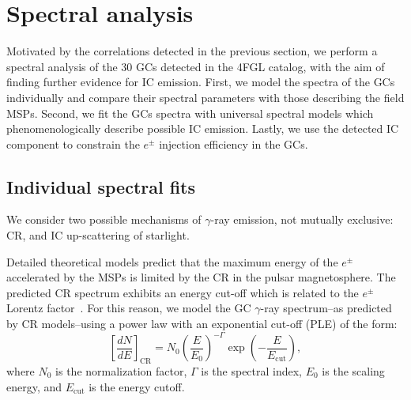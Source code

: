 \documentclass[doublespace,nopageskip]{VTthesis} %
\begin{document}
\section{Spectral analysis}\label{sec:spectra}

Motivated by the correlations detected in the previous section, we perform a spectral analysis of the 30 GCs detected in the 4FGL catalog, with the aim of finding further evidence for IC emission. First, we model the spectra of the GCs individually and compare their spectral parameters with those describing the field MSPs. Second, we fit the GCs spectra with universal spectral models which phenomenologically describe possible IC emission. Lastly, we use the detected IC component to constrain the $e^\pm$ injection efficiency in the GCs.

\subsection{Individual spectral fits}\label{sec:spectra_individual}

We consider two possible mechanisms of $\gamma$-ray emission, not mutually exclusive: CR, and IC up-scattering of starlight.

Detailed theoretical models predict that the maximum energy of the $e^\pm$ accelerated by the MSPs is limited by the CR in the pulsar magnetosphere. The predicted CR spectrum exhibits an energy cut-off which is related to the $e^\pm$ Lorentz factor~\citep{2005ApJ...622..531H}. For this reason, we model the GC $\gamma$-ray spectrum--as predicted by CR models--using a power law with an exponential cut-off (PLE) of the form:
\begin{equation}\label{eq:PLE}
    \left[ \frac{dN}{dE} \right]_{\mathrm{CR}} = N_0 \left(\frac{E}{E_0} \right)^{-\Gamma}\exp{ \left( -\frac{E}{E_\text{cut}} \right) },
\end{equation}
where $N_0$ is the normalization factor, $\Gamma$ is the spectral index, $E_0$ is the scaling energy, and $E_\mathrm{cut}$ is the energy cutoff. 
\end{document}
